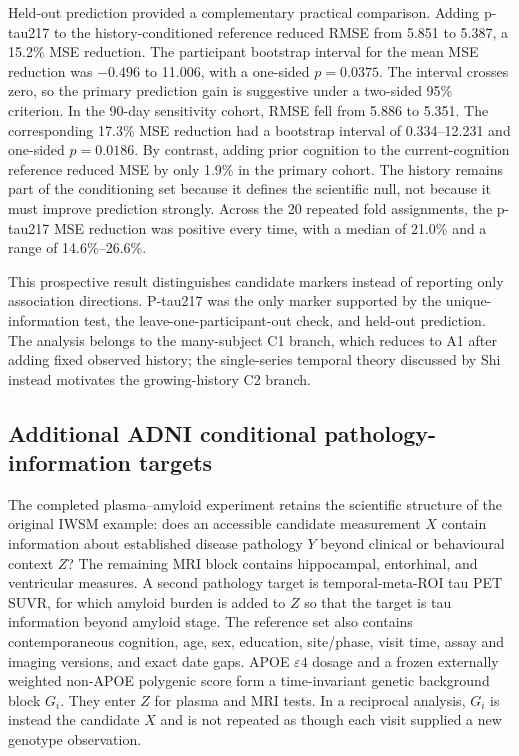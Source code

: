 \documentclass[11pt]{article}
\theoremstyle{definition}
\begin{document}
Held-out prediction provided a complementary practical comparison. Adding p-tau217 to the
history-conditioned reference reduced RMSE from 5.851 to 5.387, a 15.2\% MSE reduction. The
participant bootstrap interval for the mean MSE reduction was $-0.496$ to 11.006, with a
one-sided $p=0.0375$. The interval crosses zero, so the primary prediction gain is suggestive
under a two-sided 95\% criterion. In the 90-day sensitivity cohort, RMSE fell from 5.886 to
5.351. The corresponding 17.3\% MSE reduction had a bootstrap interval of 0.334--12.231 and
one-sided $p=0.0186$. By contrast, adding prior cognition to the current-cognition reference
reduced MSE by only 1.9\% in the primary cohort. The history remains part of the conditioning
set because it defines the scientific null, not because it must improve prediction strongly.
Across the 20 repeated fold assignments, the p-tau217 MSE reduction was positive every time,
with a median of 21.0\% and a range of 14.6\%--26.6\%.

This prospective result distinguishes candidate markers instead of reporting only association
directions. P-tau217 was the only marker supported by the unique-information test, the
leave-one-participant-out check, and held-out prediction. The analysis belongs to the
many-subject C1 branch, which reduces to A1 after adding fixed observed history; the
single-series temporal theory discussed by Shi instead motivates the growing-history C2 branch.

\subsection{Additional ADNI conditional pathology-information targets}

The completed plasma--amyloid experiment retains the scientific structure of the original IWSM example:
does an accessible candidate measurement $X$ contain information about established disease
pathology $Y$ beyond clinical or behavioural context $Z$? The remaining MRI block contains
hippocampal, entorhinal, and ventricular measures. A second pathology target is
temporal-meta-ROI tau PET SUVR, for which amyloid burden is added to $Z$ so that the target
is tau information beyond amyloid stage. The reference set also contains contemporaneous
cognition, age, sex, education, site/phase, visit time, assay and imaging versions, and exact
date gaps. APOE $\varepsilon4$ dosage and a frozen externally weighted non-APOE polygenic
score form a time-invariant genetic background block $G_i$. They enter $Z$ for plasma and
MRI tests. In a reciprocal analysis, $G_i$ is instead the candidate $X$ and is not repeated
as though each visit supplied a new genotype observation.
\end{document}
